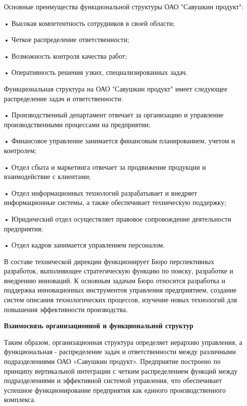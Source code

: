 {  \par \redline Основные преимущества функциональной структуры ОАО "Савушкин продукт":
  \par \redline • Высокая компетентность сотрудников в своей области;
  \par \redline • Четкое распределение ответственности;
  \par \redline • Возможность контроля качества работ;
  \par \redline • Оперативность решения узких, специализированных задач.

  \par \redline Функциональная структура на ОАО "Савушкин продукт" имеет следующее распределение задач и ответственности:
  \par \redline • Производственный департамент отвечает за организацию и управление производственными процессами на предприятии;
  \par \redline • Финансовое управление занимается финансовым планированием, учетом и контролем;
  \par \redline • Отдел сбыта и маркетинга отвечает за продвижение продукции и взаимодействие с клиентами;
  \par \redline • Отдел информационных технологий разрабатывает и внедряет информационные системы, а также обеспечивает техническую поддержку;
  \par \redline • Юридический отдел осуществляет правовое сопровождение деятельности предприятия;
  \par \redline • Отдел кадров занимается управлением персоналом.

  \par \redline В составе технической дирекции функционирует Бюро перспективных разработок, выполняющее стратегическую функцию по поиску, разработке и внедрению инноваций. К основным задачам Бюро относится разработка и поддержка инновационных инструментов управления предприятием, создание систем описания технологических процессов, изучение новых технологий для повышения эффективности производства.

  \par \redline \textbf{Взаимосвязь организационной и функциональной структур}

  \par \redline Таким образом, организационная структура определяет иерархию управления, а функциональная - распределение задач и ответственности между различными подразделениями ОАО «Савушкин продукт». Предприятие построено по принципу вертикальной интеграции с четким распределением функций между подразделениями и эффективной системой управления, что обеспечивает успешное функционирование предприятия как единого производственного комплекса.

  \par
}

